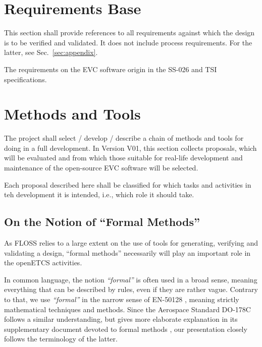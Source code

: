 \documentclass{template/openetcs_report}
\begin{document}
\section{Requirements Base}
\label{sec:requirements-base}

This section shall provide references to all requirements 
against which the design is to be verified and validated. It does not include 
process requirements. For the latter, see Sec.~\ref{sec:appendix}.

The requirements on the EVC software origin in the SS-026 and TSI
specifications.



\section{\VV Methods and Tools }
\label{sec:methods-tools}

The project shall select / develop / describe a chain of methods and
tools for doing \vv in a full development. In Version V01, this
section collects proposals, which will be evaluated and from which
those suitable for real-life
development and maintenance of the open-source EVC software will be selected.

Each proposal described here shall be classified for which tasks and
activities in teh development it is intended, i.e., which role it
should take.

\subsection{On the Notion of ``Formal Methods''}
\label{sec:notion-formal-method}

As FLOSS relies to a large extent on the use of tools for generating, 
verifying and validating a design, ``formal methods'' necessarily will
play an important role in the openETCS activities.  

In common language, the notion {\em ``formal''} is often used in a
broad sense, meaning everything that can be described by rules, even
if they are rather vague.
%
Contrary to that, we use {\em ``formal''} in the narrow sense of
EN-50128 \cite[Section~D.28]{en50128},
meaning strictly mathematical techniques and methods.
%
Since the Aerospace Standard DO-178C \cite{DO-178C}
follows a similar understanding,
but gives more elaborate explanation in its supplementary document
devoted to formal methods \cite{DO-333},
our presentation closely follows the terminology of the latter.
\end{document}
